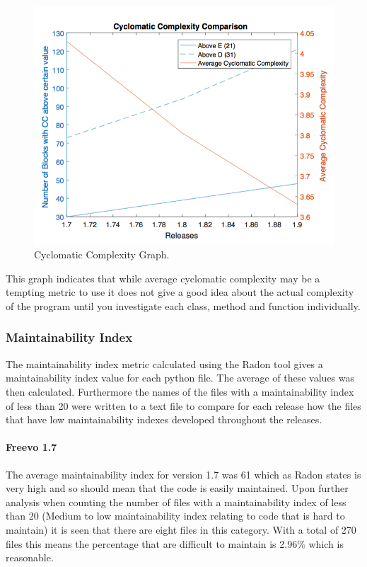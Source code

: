 \documentclass[10.5pt,journal, a4paper]{IEEEtran}
\begin{document}
 \begin{figure}[H]
 \centering 
 \includegraphics[width=\columnwidth]{CCcomp}
 \centering 
  \caption {Cyclomatic Complexity Graph. }
 \end{figure}

\noindent
 This graph indicates that while average cyclomatic complexity may be a tempting metric to use it does not give a good idea about the actual complexity of the program until you investigate each class, method and function individually. 




\subsubsection{Maintainability Index}

\noindent
The maintainability index metric calculated using the Radon tool gives a maintainability index value for each python file. The average of these values was then calculated. Furthermore the names of the files with a maintainability index of less than 20 were written to a text file to compare for each release how the files that have low maintainability indexes developed throughout the releases.  
\paragraph{Freevo 1.7}
\noindent
The average maintainability index for version 1.7 was 61 which as Radon states is very high and so should mean that the code is easily maintained. Upon further analysis when counting the number of files with a maintainability index of less than 20 (Medium to low maintainability index relating to code that is hard to maintain) it is seen that there are eight files in this category. With a total of 270 files this means the percentage that are difficult to maintain is 2.96\% which is reasonable.
\end{document}
